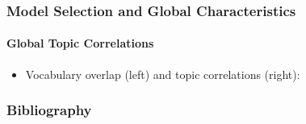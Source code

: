 \documentclass[xcolor=dvipsnames]{beamer}
\begin{document}
\begin{frame}
\frametitle{Model Selection and Global Characteristics}
\framesubtitle{Global Topic Correlations}
\begin{itemize}
\item Vocabulary overlap (left) and topic correlations (right):
\begin{figure}[h!]
\end{figure}		
\end{itemize}
\end{frame}

\begin{frame}
\frametitle{Bibliography}
\printbibliography
\end{frame}
\end{document}
